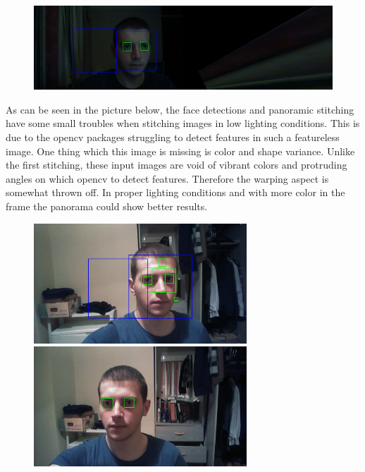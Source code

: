 \documentclass{article}
\begin{document}
\begin{figure}[H]
	\centering
	\includegraphics[width=15cm]{afce_pano.png}

	
\end{figure}

As can be seen in the picture below, the face detections and panoramic stitching have some small troubles when stitching images in low lighting conditions. This is due to the opencv packages struggling to detect features in such a featureless image. One thing which this image is missing is color and shape variance. Unlike the first stitching, these input images are void of vibrant colors and protruding angles on which opencv to detect features.
Therefore the warping aspect is somewhat thrown off. In proper lighting conditions and with more color in the frame the panorama could show better results.

\begin{figure}[H]
	\centering
	\includegraphics[width=8cm]{pk1.png}
	\includegraphics[width=8cm]{pk2.png}
	
\end{figure}
\end{document}
